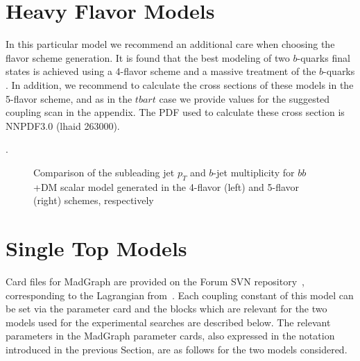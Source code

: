 \section{Heavy Flavor Models} 
In this particular model we recommend an additional care when choosing
the flavor scheme generation. 
It is found that the best modeling of two $b$-quarks final states is
achieved using a 4-flavor scheme and a massive treatment of the
$b$-quarks .
In addition, we recommend to calculate the cross sections of these
models in the 5-flavor scheme, and as in the $t bar t$ case we provide 
values for the suggested coupling scan in the appendix. 
The PDF used to calculate these cross section is NNPDF3.0 (lhaid 263000). 

.

\begin{figure}
  \vbox{\hfill}
  \caption{Comparison of the subleading jet $p_T$ and $b$-jet multiplicity
    for $bb$+DM scalar model generated in the 4-flavor (left) and 5-flavor (right)
    schemes, respectively}
\end{figure}

\section{Single Top Models}

Card files for MadGraph are provided on the Forum SVN repository~\cite{ForumSVN_EWMonoTop}, 
corresponding to the Lagrangian from~\cite{AndreaFuksMaltoni}. 
Each coupling constant of this model can be set via the parameter card and 
the blocks which are relevant for the two models used for the experimental searches are described below.
The relevant parameters in the MadGraph parameter cards, also expressed in the notation introduced in the 
previous Section, are as follows for the two models considered.

